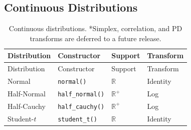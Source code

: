 \documentclass[
  11pt,
]{article}
\begin{document}
\subsection{Continuous Distributions}\label{continuous-distributions}

\begin{longtable}[]{@{}
  >{\raggedright\arraybackslash}p{}
  >{\raggedright\arraybackslash}p{}
  >{\raggedright\arraybackslash}p{}
  >{\raggedright\arraybackslash}p{}@{}}
\caption{Continuous distributions. *Simplex, correlation, and PD
transforms are deferred to a future release.}\tabularnewline
\toprule\noalign{}
\begin{minipage}[b]{\linewidth}\raggedright
Distribution
\end{minipage} & \begin{minipage}[b]{\linewidth}\raggedright
Constructor
\end{minipage} & \begin{minipage}[b]{\linewidth}\raggedright
Support
\end{minipage} & \begin{minipage}[b]{\linewidth}\raggedright
Transform
\end{minipage} \\
\midrule\noalign{}
\endfirsthead
\toprule\noalign{}
\begin{minipage}[b]{\linewidth}\raggedright
Distribution
\end{minipage} & \begin{minipage}[b]{\linewidth}\raggedright
Constructor
\end{minipage} & \begin{minipage}[b]{\linewidth}\raggedright
Support
\end{minipage} & \begin{minipage}[b]{\linewidth}\raggedright
Transform
\end{minipage} \\
\midrule\noalign{}
\endhead
\bottomrule\noalign{}
\endlastfoot
Normal & \texttt{normal()} & \(\mathbb{R}\) & Identity \\
Half-Normal & \texttt{half\_normal()} & \(\mathbb{R}^+\) & Log \\
Half-Cauchy & \texttt{half\_cauchy()} & \(\mathbb{R}^+\) & Log \\
Student-\(t\) & \texttt{student\_t()} & \(\mathbb{R}\) & Identity \\

\end{longtable}
\end{document}
